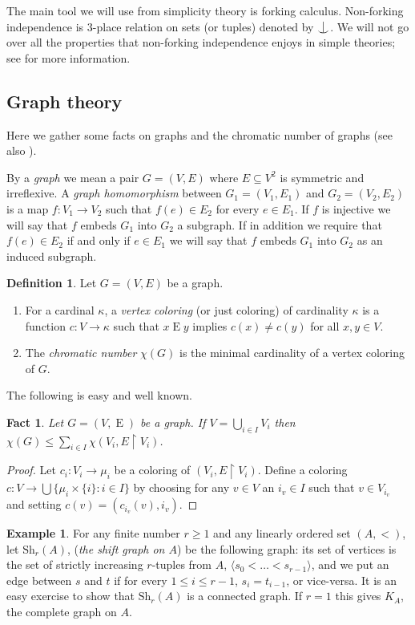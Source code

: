 \documentclass[a4paper]{amsart}
\theoremstyle{plain}
\newtheorem{fact}[theorem]{Fact}
\theoremstyle{definition}
\newtheorem{definition}[theorem]{Definition}
\newtheorem{example}[theorem]{Example}
\theoremstyle{remark}
\numberwithin{equation}{section}
\newcommand{\forkindep}[1][]{%
  \mathrel{
    \mathop{
      \vcenter{
        \hbox{\oalign{\noalign{\kern-.3ex}\hfil$\vert$\hfil\cr
              \noalign{\kern-.7ex}
              $\smile$\cr\noalign{\kern-.3ex}}}
      }
    }\displaylimits_{#1}
  }
}
\newcommand{\Sh}{\text{Sh}}
\newcommand{\E}{\mathrel{E}}
\begin{document}
The main tool we will use from simplicity theory is forking calculus. Non-forking independence is 3-place relation on sets (or tuples) denoted by $\forkindep$. We will not go over all the properties that non-forking independence enjoys in simple theories; see \cite[Chapter 7]{TZ} for more information.

\subsection{Graph theory}
Here we gather some facts on graphs and the chromatic number of graphs (see also \cite{1196}).

By a \emph{graph} we mean a pair $G=(V,E)$ where $E\subseteq V^2$ is symmetric and irreflexive. A \emph{graph homomorphism} between $G_1=(V_1,E_1)$ and $G_2=(V_2,E_2)$ is a map $f:V_1\to V_2$ such that $f(e)\in E_2$ for every $e\in E_1$. If $f$ is injective we will say that $f$ embeds $G_1$ into $G_2$ a subgraph. If in addition we require that $f(e)\in E_2$ if and only if $e\in E_1$ we will say that $f$ embeds $G_1$ into $G_2$ as an induced subgraph.


\begin{definition}
Let $G=(V,E)$ be a graph.
\begin{enumerate}
\item For a cardinal $\kappa$, a \emph{vertex coloring} (or just coloring) of cardinality $\kappa$ is a function $c:V\to \kappa$ such that $x\E y$ implies $c(x)\neq c(y)$ for all $x,y\in V$.
\item The \emph{chromatic number} $\chi(G)$ is the minimal cardinality of a vertex coloring of $G$.
\end{enumerate}
\end{definition}

The following is easy and well known.

\begin{fact}\label{F:basic-prop-chi}
Let $G=(V,\E)$ be a graph.
If $V=\bigcup_{i\in I} V_i$ then $\chi(G)\leq \sum_{i\in I} \chi(V_i, E\restriction V_i)$.
\end{fact}
\begin{proof}
Let $c_i:V_i\to \mu_i$ be a coloring of $(V_i,E\restriction V_i)$. Define a coloring $c:V\to \bigcup \{\mu_i\times\{i\}:i\in I\}$ by choosing for any $v\in V$ an $i_v\in I$ such that $v\in V_{i_v}$ and setting $c(v)=(c_{i_v}(v),i_v)$.
\end{proof}

\begin{example} \label{E:shift}
For any finite number $r\geq 1$ and any linearly ordered set $(A,<)$, let $\Sh_r(A)$, (\emph{the shift graph on $A$}) be the following graph: its set of vertices is the set of strictly increasing $r$-tuples from $A$, $\langle s_0<\dots<s_{r-1}\rangle $, and we put an edge between $s$ and $t$ if for every $1\leq i\leq r-1$, $s_i=t_{i-1}$, or vice-versa. It is an easy exercise to show that $\Sh_r(A)$ is a connected graph. If $r=1$ this gives $K_{A}$, the complete graph on $A$.
\end{example}
\end{document}
